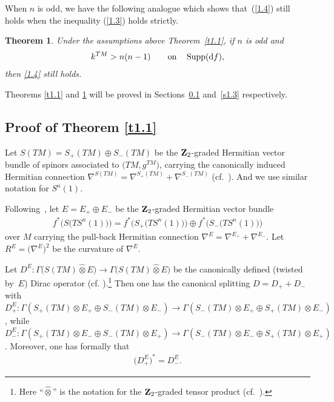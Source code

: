 \documentclass[10pt,a4paper]{amsart}
\numberwithin{equation}{section}
\newtheorem{thm}{Theorem}[section]
\theoremstyle{definition}
\begin{document}
When $n$ is odd, we have the following analogue which shows that~(\ref{1.4}) still holds when the inequality (\ref{1.3}) holds strictly.

\begin{thm}\label{t1.2} Under the assumptions above Theorem~{\rm \ref{t1.1}}, if $n$ is odd and
\begin{gather*}%
k^{TM}> n(n-1) \qquad {\rm on}\quad \operatorname{Supp}({\rm d}f),
\end{gather*}
then \eqref{1.4} still holds.
\end{thm}

Theorems \ref{t1.1} and \ref{t1.2} will be proved in Sections~\ref{s1.2} and~\ref{s1.3} respectively.

\subsection{Proof of Theorem \ref{t1.1}}\label{s1.2}

Let $S(TM)=S_+(TM)\oplus S_-(TM)$ be the ${\bf Z}_2$-graded Hermitian vector bundle of spinors associated to $\big(TM,g^{TM}\big)$, carrying the canonically induced Hermitian connection $\nabla^{S(TM)}=\nabla^{S_+(TM)}+\nabla^{S_-(TM)}$ (cf.~\cite{LaMi89}). And we use similar notation for $ S^n(1)$.

Following~\cite{L98}, let $E=E_+\oplus E_-$ be the ${\bf Z}_2$-graded Hermitian vector bundle
\begin{gather}\label{1.4b}
f^*\big(S\big(TS^n(1)\big)\big)=f^*\big(S_+\big(TS^n(1)\big)\big)\oplus f^*\big(S_-\big(TS^n(1)\big)\big)
\end{gather}
over $M$ carrying the pull-back Hermitian connection $\nabla^E=\nabla^{E_+}+\nabla^{E_-}$. Let $R^E=\big(\nabla^E\big)^2$ be the curvature of $\nabla^E$.

Let $D^E\colon \Gamma\big(S(TM)\widehat\otimes E\big)\rightarrow
\Gamma\big(S(TM)\widehat\otimes E\big)$ be the canonically defined (twisted by~$E$) Dirac operator (cf. \cite{LaMi89}).\footnote{Here ``$\widehat\otimes$'' is the notation for the ${\bf Z}_2$-graded tensor product (cf.~\cite{Q85}).} Then one has the canonical splitting $D=D_++D_-$ with $D^E_+\colon \Gamma(S_+(TM) \otimes E_+\oplus S_-(TM)\otimes E_-) \rightarrow \Gamma(S_-(TM) \otimes E_+\oplus S_+(TM)\otimes E_-) $, while $D^E_-\colon \Gamma(S_+(TM) \otimes E_-\oplus S_-(TM)\otimes E_+) \rightarrow \Gamma(S_-(TM) \otimes E_-\oplus S_+(TM)\otimes E_+) $. Moreover, one has formally that
\begin{gather*}%
\big(D^E_+\big)^*=D^E_-.
\end{gather*}
\end{document}
